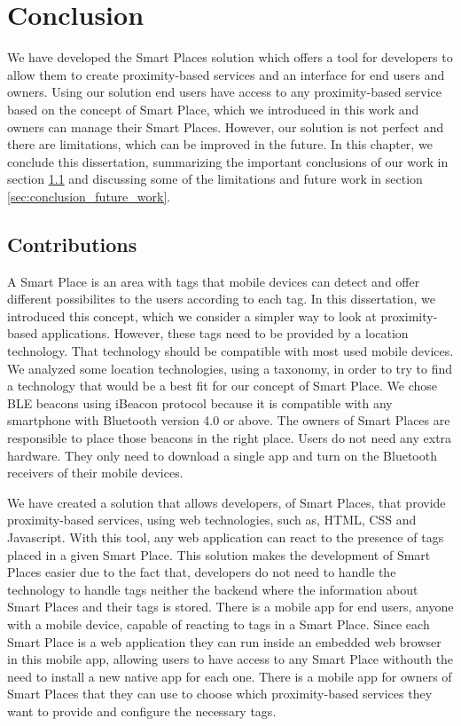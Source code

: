 
\chapter{Conclusion}
\label{chapter:conclusion}
We have developed the Smart Places solution which offers a tool for developers to allow them to create proximity-based services and an interface for end users and owners.
Using our solution end users have access to any proximity-based service based on the concept of Smart Place, which we introduced in this work and owners can manage their Smart Places.
However, our solution is not perfect and there are limitations, which can be improved in the future.
In this chapter, we conclude this dissertation, summarizing the important conclusions of our work in section \ref{sec:conclusion_contributions} and discussing some of the limitations and future work in section \ref{sec:conclusion_future_work}.

\section{Contributions}
\label{sec:conclusion_contributions}
A Smart Place is an area with tags that mobile devices can detect and offer different possibilites to the users according to each tag.
In this dissertation, we introduced this concept, which we consider a simpler way to look at proximity-based applications.
However, these tags need to be provided by a location technology.
That technology should be compatible with most used mobile devices.
We analyzed some location technologies, using a taxonomy\cite{location}, in order to try to find a technology that would be a best fit for our concept of Smart Place.
We chose \gls{BLE} beacons using iBeacon protocol because it is compatible with any smartphone with Bluetooth version 4.0 or above.
The owners of Smart Places are responsible to place those beacons in the right place.
Users do not need any extra hardware.
They only need to download a single app and turn on the Bluetooth receivers of their mobile devices.

We have created a solution that allows developers, of Smart Places, that provide proximity-based services, using web technologies, such as, \gls{HTML}, \gls{CSS} and Javascript.
With this tool, any web application can react to the presence of tags placed in a given Smart Place.
This solution makes the development of Smart Places easier due to the fact that, developers do not need to handle the technology to handle tags neither the backend where the information about Smart Places and their tags is stored.
There is a mobile app for end users, anyone with a mobile device, capable of reacting to tags in a Smart Place.
Since each Smart Place is a web application they can run inside an embedded web browser in this mobile app, allowing users to have access to any Smart Place withouth the need to install a new native app for each one.
There is a mobile app for owners of Smart Places that they can use to choose which proximity-based services they want to provide and configure the necessary tags.

